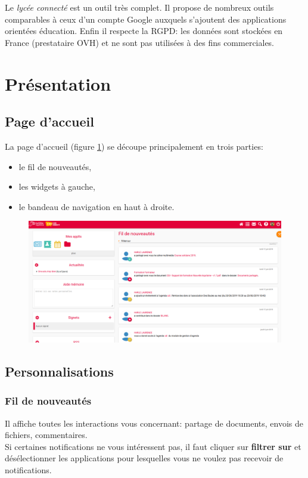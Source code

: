 \documentclass[a4paper,11pt]{article}
\begin{document}
\begin{Form}
Le \emph{lycée connecté} est un outil très complet. Il propose de nombreux outils comparables à ceux d'un compte Google auxquels s'ajoutent des applications orientées éducation. Enfin il respecte la RGPD: les données sont stockées en France (prestataire OVH) et ne sont pas utilisées à des fins commerciales.
\section{Présentation}
\subsection{Page d'accueil}
La page d'accueil (figure \ref{accueil}) se découpe principalement en trois parties:
\begin{itemize}
\item le fil de nouveautés,
\item les widgets à gauche,
\item le bandeau de navigation en haut à droite.
\end{itemize}
\begin{figure}[!h]
\centering
\includegraphics[width=13cm]{ressources/timeline.png}
\label{accueil}
\end{figure}
\subsection{Personnalisations}
\subsubsection{Fil de nouveautés}
Il affiche toutes les interactions vous concernant: partage de documents, envois de fichiers, commentaires.\\
Si certaines notifications ne vous intéressent pas, il faut cliquer sur \textbf{filtrer sur} et désélectionner les applications pour lesquelles vous ne voulez pas recevoir de notifications.

\end{Form}
\end{document}
